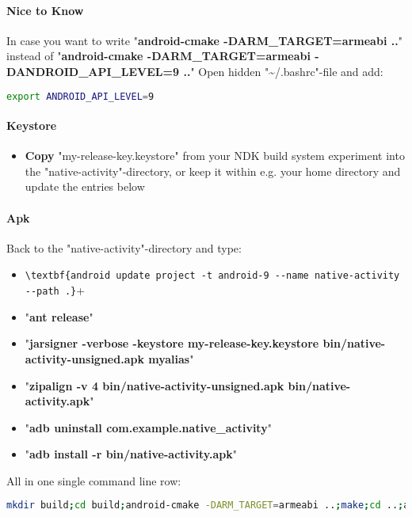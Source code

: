 \paragraph{Nice to Know}
In case you want to write "\textbf{android-cmake -DARM\_TARGET=armeabi ..}" instead of "\textbf{android-cmake -DARM\_TARGET=armeabi -DANDROID\_API\_LEVEL=9 ..}" \textrightarrow  Open hidden "\textasciitilde /.bashrc"-file and add:
\begin{lstlisting}[language=bash]
export ANDROID_API_LEVEL=9
\end{lstlisting}


\paragraph{Keystore}
\begin{itemize}
\item{\textbf{Copy} "my-release-key.keystore" from your NDK build system experiment into the "native-activity"-directory, or keep it within e.g. your home directory and update the entries below}
\end{itemize}


\paragraph{Apk}
Back to the "native-activity"-directory and type:
\begin{itemize}
\item{\verb"\textbf{android update project -t android-9 --name native-activity --path .}"+}
\item{"\textbf{ant release}"}
\item{"\textbf{jarsigner -verbose -keystore my-release-key.keystore bin/native-activity-unsigned.apk myalias}"}
\item{"\textbf{zipalign -v 4 bin/native-activity-unsigned.apk bin/native-activity.apk}"}
\item{"\textbf{adb uninstall com.example.native\_activity}"}
\item{"\textbf{adb install -r bin/native-activity.apk}"}
\end{itemize}

All in one single command line row:
\begin{lstlisting}[language=bash]
mkdir build;cd build;android-cmake -DARM_TARGET=armeabi ..;make;cd ..;android update project -t android-9 --name native-activity --path .;ant release;jarsigner -verbose -keystore my-release-key.keystore bin/native-activity-unsigned.apk myalias;rm bin/native-activity.apk;zipalign -v 4 bin/native-activity-unsigned.apk bin/native-activity.apk;adb uninstall com.example.native_activity;adb install -r bin/native-activity.apk
\end{lstlisting}




